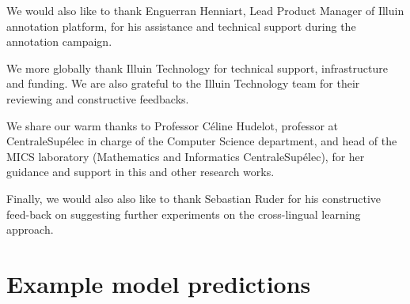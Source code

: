 \documentclass{article}
\begin{document}
We would also like to thank Enguerran Henniart, Lead Product Manager of Illuin annotation platform, for his assistance and technical support during the annotation campaign.

We more globally thank Illuin Technology for technical support, infrastructure and funding. 
We are also grateful to the Illuin Technology team for their reviewing and constructive feedbacks.

We share our warm thanks to Professor Céline Hudelot, professor at CentraleSupélec in charge of the Computer Science department, and head of the MICS laboratory (Mathematics and Informatics CentraleSupélec), for her guidance and support in this and other research works.  

Finally, we would also also like to thank Sebastian Ruder for his constructive feed-back on suggesting further experiments on the cross-lingual learning approach. 


\clearpage
\appendix

\section{Example model predictions}
\end{document}
